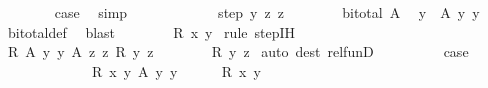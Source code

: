 \begin{isabellebody}
\ \ \ \ \ \ \isamarkupfalse%
\ {\isacharquery}{\kern0pt}case\ \isamarkupfalse%
\ simp\isanewline
\ \ \ \ \isamarkupfalse%
\isanewline
\ \ \ \ \ \ \isamarkupfalse%
\ {\isacharparenleft}{\kern0pt}step\ y\ z\ z{\isacharprime}{\kern0pt}{\isacharparenright}{\kern0pt}\isanewline
\ \ \ \ \ \ \isamarkupfalse%
\ {\isacartoucheopen}bi{\isacharunderscore}{\kern0pt}total\ A{\isacartoucheclose}\ \isamarkupfalse%
\ y{\isacharprime}{\kern0pt}\ \ {\isachardoublequoteopen}A\ y\ y{\isacharprime}{\kern0pt}{\isachardoublequoteclose}\ \isamarkupfalse%
\ bi{\isacharunderscore}{\kern0pt}total{\isacharunderscore}{\kern0pt}def\ \isamarkupfalse%
\ blast\isanewline
\ \ \ \ \ \ \isamarkupfalse%
\ {\isachardoublequoteopen}R{\isacharprime}{\kern0pt}\isactrlsup {\isacharasterisk}{\kern0pt}\isactrlsup {\isacharasterisk}{\kern0pt}\ x{\isacharprime}{\kern0pt}\ y{\isacharprime}{\kern0pt}{\isachardoublequoteclose}\ \isamarkupfalse%
{\isacharparenleft}{\kern0pt}rule\ step{\isachardot}{\kern0pt}IH{\isacharparenright}{\kern0pt}\isanewline
\ \ \ \ \ \ \isamarkupfalse%
\ \isamarkupfalse%
\ R\ {\isacartoucheopen}A\ y\ y{\isacharprime}{\kern0pt}{\isacartoucheclose}\ {\isacartoucheopen}A\ z\ z{\isacharprime}{\kern0pt}{\isacartoucheclose}\ {\isacartoucheopen}R\ y\ z{\isacartoucheclose}\isanewline
\ \ \ \ \ \ \isamarkupfalse%
\ {\isachardoublequoteopen}R{\isacharprime}{\kern0pt}\ y{\isacharprime}{\kern0pt}\ z{\isacharprime}{\kern0pt}{\isachardoublequoteclose}\ \isamarkupfalse%
{\isacharparenleft}{\kern0pt}auto\ dest{\isacharcolon}{\kern0pt}\ rel{\isacharunderscore}{\kern0pt}funD{\isacharparenright}{\kern0pt}\isanewline
\ \ \ \ \ \ \isamarkupfalse%
\ \isamarkupfalse%
\ {\isacharquery}{\kern0pt}case\ \isacommand{{\isachardot}{\kern0pt}{\isachardot}{\kern0pt}}\isamarkupfalse%
\isanewline
\ \ \ \ \isamarkupfalse%
\isanewline
\ \ \isamarkupfalse%
\isanewline
\ \ \ \ \isamarkupfalse%
\ {\isachardoublequoteopen}R{\isacharprime}{\kern0pt}\isactrlsup {\isacharasterisk}{\kern0pt}\isactrlsup {\isacharasterisk}{\kern0pt}\ x{\isacharprime}{\kern0pt}\ y{\isacharprime}{\kern0pt}{\isachardoublequoteclose}\ {\isachardoublequoteopen}A\ y\ y{\isacharprime}{\kern0pt}{\isachardoublequoteclose}\isanewline
\ \ \ \ \isamarkupfalse%
\ {\isachardoublequoteopen}R\isactrlsup {\isacharasterisk}{\kern0pt}\isactrlsup {\isacharasterisk}{\kern0pt}\ x\ y{\isachardoublequoteclose}\isanewline

\end{isabellebody}
